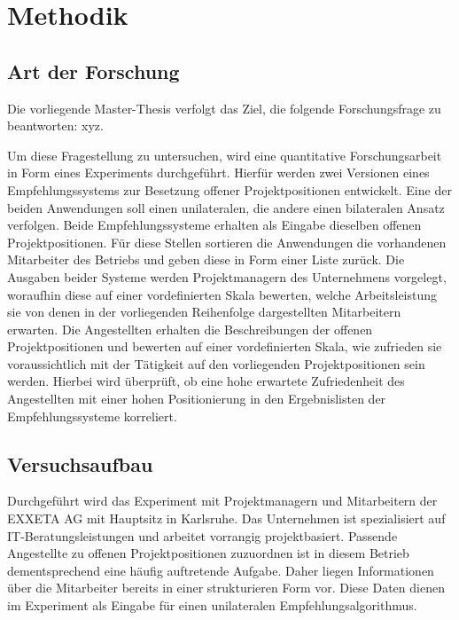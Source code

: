 \chapter{Methodik}
\label{ch:methodik}

\section{Art der Forschung}
\label{ch:methodik:art}
Die vorliegende Master-Thesis verfolgt das Ziel, die folgende Forschungsfrage zu beantworten: xyz.

Um diese Fragestellung zu untersuchen, wird eine quantitative Forschungsarbeit in Form eines Experiments durchgeführt. Hierfür werden zwei Versionen eines Empfehlungssystems zur Besetzung offener Projektpositionen entwickelt. Eine der beiden Anwendungen soll einen unilateralen, die andere einen bilateralen Ansatz verfolgen. Beide Empfehlungssysteme erhalten als Eingabe dieselben offenen Projektpositionen. Für diese Stellen sortieren die Anwendungen die vorhandenen Mitarbeiter des Betriebs und geben diese in Form einer Liste zurück. Die Ausgaben beider Systeme werden Projektmanagern des Unternehmens vorgelegt, woraufhin diese auf einer vordefinierten Skala bewerten, welche Arbeitsleistung sie von denen in der vorliegenden Reihenfolge dargestellten Mitarbeitern erwarten. Die Angestellten erhalten die Beschreibungen der offenen Projektpositionen und bewerten auf einer vordefinierten Skala, wie zufrieden sie voraussichtlich mit der Tätigkeit auf den vorliegenden Projektpositionen sein werden. Hierbei wird überprüft, ob eine hohe erwartete Zufriedenheit des Angestellten mit einer hohen Positionierung in den Ergebnislisten der Empfehlungssysteme korreliert.

\section{Versuchsaufbau}
\label{ch:methodik:versuchsaufbau}
Durchgeführt wird das Experiment mit Projektmanagern und Mitarbeitern der EXXETA AG mit Hauptsitz in Karlsruhe. Das Unternehmen ist spezialisiert auf IT-Beratungsleistungen und arbeitet vorrangig projektbasiert. Passende Angestellte zu offenen Projektpositionen zuzuordnen ist in diesem Betrieb dementsprechend eine häufig auftretende Aufgabe. Daher liegen Informationen über die Mitarbeiter bereits in einer strukturieren Form vor. Diese Daten dienen im Experiment als Eingabe für einen unilateralen Empfehlungsalgorithmus.

